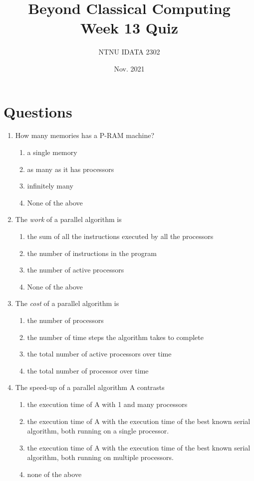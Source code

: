 \documentclass[11pt]{article}
\author{NTNU IDATA 2302}
\date{Nov. 2021}
\title{Beyond Classical Computing\\\medskip
\large Week 13 Quiz}
\begin{document}
\maketitle


\section{Questions}
\label{sec:org78b28eb}

\begin{enumerate}
\item How many memories has a P-RAM machine?
\begin{enumerate}
\item a single memory
\item as many as it has processors
\item infinitely many
\item None of the above
\end{enumerate}

\item The \emph{work} of a parallel algorithm is
\begin{enumerate}
\item the sum of all the instructions executed by all the processors
\item the number of instructions in the program
\item the number of active processors
\item None of the above
\end{enumerate}

\item The \emph{cost} of a parallel algorithm is
\begin{enumerate}
\item the number of processors
\item the number of time steps the algorithm takes to complete
\item the total number of active processors over time
\item the total number of processor over time
\end{enumerate}

\item The speed-up of a parallel algorithm A contrasts
\begin{enumerate}
\item the execution time of A with 1 and many processors
\item the execution time of A with the execution time of the best
known serial algorithm, both running on a single processor.
\item the execution time of A with the execution time of the best
known serial algorithm, both running on multiple processors.
\item none of the above
\end{enumerate}


\end{enumerate}
\end{document}
